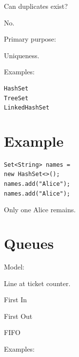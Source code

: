 \documentclass[11pt,a4paper]{book}
\begin{document}
Can duplicates exist?


No.


Primary purpose:


Uniqueness.


Examples:

\begin{verbatim}
HashSet
TreeSet
LinkedHashSet
\end{verbatim}


\section{Example}

\begin{verbatim} 
Set<String> names =
new HashSet<>();
names.add("Alice");
names.add("Alice");
\end{verbatim}


Only one Alice remains.


\section{Queues}

Model:


Line at ticket counter.


First In

First Out


FIFO


Examples:
\end{document}
